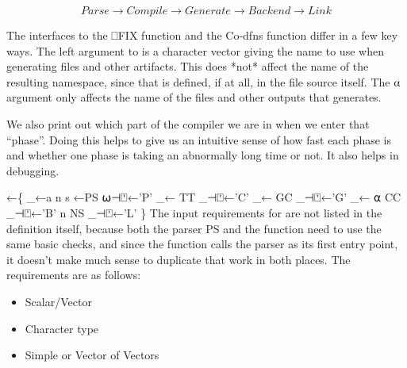 \documentclass{article}%
\begin{document}
$$Parse → Compile → Generate → Backend → Link$$

\noindent
The interfaces to the {\Tt{}⎕FIX\nwendquote} function and the Co-dfns {\Tt{}\nwendquote}
function differ in a few key ways.
The left argument to {\Tt{}\nwendquote} is a character vector giving the name
to use when generating files and other artifacts.
This does *not* affect the name of the resulting namespace,
since that is defined, if at all, in the file source itself.
The {\Tt{}⍺\nwendquote} argument only affects the name of the files and other
outputs that {\Tt{}\nwendquote} generates.

We also print out which part of the compiler we are in when we
enter that ``phase''. Doing this helps to give us an intuitive sense
of how fast each phase is and whether one phase is taking an
abnormally long time or not.
It also helps in debugging.

\nwenddocs{}\endmoddef\nwstartdeflinemarkup{}\nwenddeflinemarkup
{}←\{
        _←a n s ←PS ⍵⊣⍞←'P'
        _←          TT _⊣⍞←'C'
        _←          GC _⊣⍞←'G'
        _←        ⍺ CC _⊣⍞←'B'
                  n NS _⊣⍞←'L'
\}
\eatline
{}\nwendcode{}\nwdocspar
The input requirements for {\Tt{}\nwendquote} are not listed in the definition
itself, because both the parser {\Tt{}PS\nwendquote} and the {\Tt{}\nwendquote} function
need to use the same basic checks,
and since the {\Tt{}\nwendquote} function calls the parser
as its first entry point,
it doesn't make much sense to
duplicate that work in both places.
The requirements are as follows:

\begin{itemize}
        \item Scalar/Vector
        \item Character type
        \item Simple or Vector of Vectors
\end{itemize}
\end{document}
